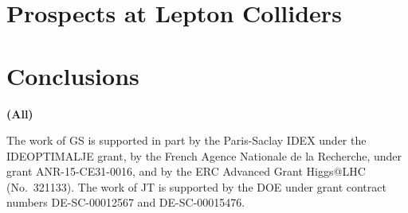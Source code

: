 \documentclass[11pt,letterpaper]{article}
\newcommand{\info}[1]{\textbf{\textcolor{mildred}{(#1)}}}
\begin{document}


\section{Prospects at Lepton Colliders}



\section{Conclusions}

\info{All}

\begin{acknowledgments}

The work of GS is supported in part by the Paris-Saclay IDEX under the
IDEOPTIMALJE grant, by the French Agence Nationale de la Recherche,
under grant ANR-15-CE31-0016, and by the ERC Advanced Grant Higgs@LHC
(No.\ 321133).
%
The work of JT is supported by the DOE under grant contract numbers DE-SC-00012567 and DE-SC-00015476.

\end{acknowledgments}



\end{document}
